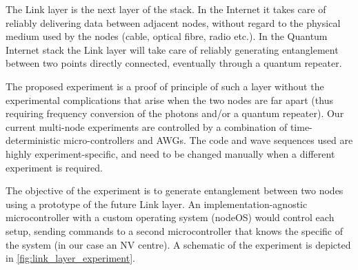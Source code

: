 \documentclass[a4paper]{article}
\begin{document}
The Link layer is the next layer of the stack. In the Internet it takes care of reliably delivering data between adjacent nodes, without regard to the physical medium used by the nodes (cable, optical fibre, radio etc.).  In the Quantum Internet stack the Link layer will take care of reliably generating entanglement between two points directly connected, eventually through a quantum repeater.

The proposed experiment is a proof of principle of such a layer without the experimental complications that arise when the two nodes are far apart (thus requiring frequency conversion of the photons and/or a quantum repeater).
Our current multi-node experiments are controlled by a combination of time-deterministic micro-controllers and \acp{AWG}. The code and wave sequences used are highly experiment-specific, and need to be changed manually when a different experiment is required.

The objective of the experiment is to generate entanglement between two nodes using a prototype of the future Link layer.
An implementation-agnostic microcontroller with a custom operating system (nodeOS) would control each setup, sending commands to a second microcontroller that knows the specific of the system (in our case an \ac{NV} centre). A schematic of the experiment is depicted in \autoref{fig:link_layer_experiment}.
\end{document}
